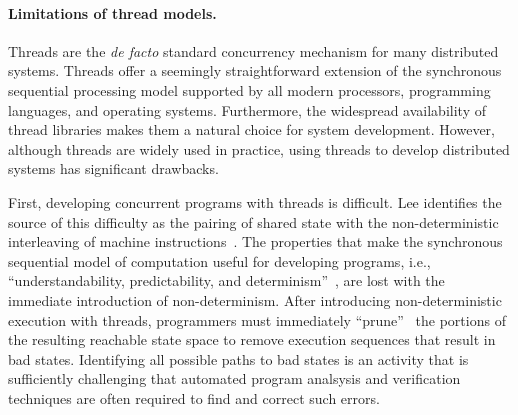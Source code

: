 \paragraph{Limitations of thread models.}
Threads are the \emph{de facto} standard concurrency mechanism for many distributed systems.
Threads offer a seemingly straightforward extension of the synchronous sequential processing model supported by all modern processors, programming languages, and operating systems.
Furthermore, the widespread availability of thread libraries makes them a natural choice for system development.
However, although threads are widely used in practice, using threads to develop distributed systems has significant drawbacks.

First, developing concurrent programs with threads is difficult.
Lee identifies the source of this difficulty as the pairing of shared state with the non-deterministic interleaving of machine instructions~\cite{lee2006problem}.
The properties that make the synchronous sequential model of computation useful for developing programs, i.e., ``understandability, predictability, and determinism''~\cite{lee2006problem}, are lost with the immediate introduction of non-determinism.
After introducing non-deterministic execution with threads, programmers must immediately ``prune''~\cite{lee2006problem} the portions of the resulting reachable state space to remove execution sequences that result in bad states.
Identifying all possible paths to bad states is an activity that is sufficiently challenging that automated program analsysis and verification techniques are often required to find and correct such errors.


